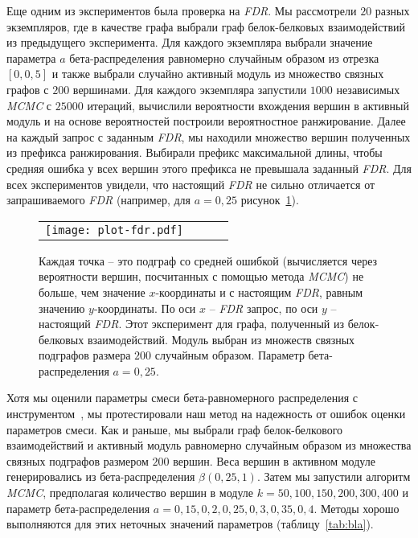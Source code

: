 Еще одним из экспериментов была проверка на \emph{FDR}.  Мы рассмотрели $20$
разных экземпляров, где в качестве графа выбрали граф белок-белковых
взаимодействий из предыдущего эксперимента.  Для каждого экземпляра выбрали
значение параметра $a$ бета-распределения равномерно случайным образом из
отрезка $[0, 0,5]$ и также выбрали случайно активный модуль из множество
связных графов с $200$ вершинами.  Для каждого экземпляра запустили $1000$
независимых \emph{MCMC} с $25000$ итераций, вычислили вероятности вхождения
вершин в активный модуль и на основе вероятностей построили вероятностное
ранжирование.  Далее на каждый запрос с заданным \emph{FDR}, мы находили
множество вершин полученных из префикса ранжирования.  Выбирали префикс
максимальной длины, чтобы средняя ошибка у всех вершин этого префикса не
превышала заданный \emph{FDR}.  Для всех экспериментов увидели, что настоящий
\emph{FDR} не сильно отличается от запрашиваемого \emph{FDR} (например, для $a
= 0,25$ рисунок~\ref{fig:fdr}).

\begin{figure}
    \centering
    \begin{tabular}{@{}cccc@{}}
        \texttt{[image: plot-fdr.pdf]}
    \end{tabular}
    \caption{
        Каждая точка -- это подграф со средней ошибкой (вычисляется через
        вероятности вершин, посчитанных с помощью метода \emph{MCMC}) не
        больше, чем значение $x$-координаты и с настоящим \emph{FDR}, равным
        значению $y$-координаты.  По оси $x$ -- \emph{FDR} запрос, по оси $y$
        -- настоящий \emph{FDR}.  Этот эксперимент для графа, полученный из
        белок-белковых взаимодействий.  Модуль выбран из множеств связных
        подграфов размера $200$ случайным образом. Параметр бета-распределения
        $a=0,25$.
    }%
    \label{fig:fdr}%
\end{figure}

Хотя мы оценили параметры смеси бета-равномерного распределения
с инструментом~\cite{Beisser2010}, мы протестировали наш метод на надежность от
ошибок оценки параметров смеси.  Как и раньше, мы выбрали граф белок-белкового
взаимодействий и активный модуль равномерно случайным образом из множества
связных подграфов размером $200$ вершин.  Веса вершин в активном модуле
генерировались из бета-распределения $\beta(0,25, 1)$.  Затем мы запустили
алгоритм \emph{MCMC}, предполагая количество вершин в модуле $k = 50, 100, 150,
200, 300, 400$ и параметр бета-распределения $a = 0,15, 0,2, 0,25, 0,3,
0,35, 0,4$.  Методы хорошо выполняются для этих неточных значений параметров
  (таблицу~\ref{tab:bla}).

